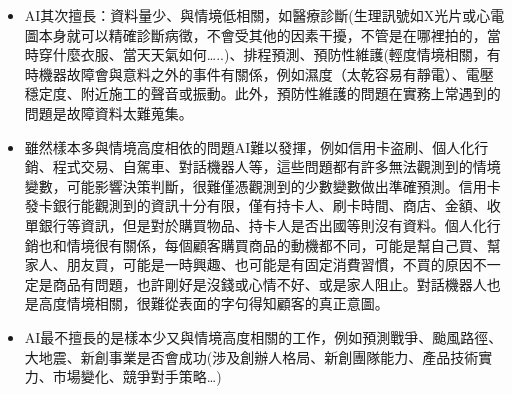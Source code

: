 \documentclass[a4paper,12pt]{article}
\begin{document}
\begin{itemize}
\item AI其次擅長：資料量少、與情境低相關，如醫療診斷(生理訊號如X光片或心電圖本身就可以精確診斷病徵，不會受其他的因素干擾，不管是在哪裡拍的，當時穿什麼衣服、當天天氣如何\ldots{}..)、排程預測、預防性維護(輕度情境相關，有時機器故障會與意料之外的事件有關係，例如濕度（太乾容易有靜電）、電壓穩定度、附近施工的聲音或振動。此外，預防性維護的問題在實務上常遇到的問題是故障資料太難蒐集。\\
\item 雖然樣本多與情境高度相依的問題AI難以發揮，例如信用卡盗刷、個人化行銷、程式交易、自駕車、對話機器人等，這些問題都有許多無法觀測到的情境變數，可能影響決策判斷，很難僅憑觀測到的少數變數做出準確預測。信用卡發卡銀行能觀測到的資訊十分有限，僅有持卡人、刷卡時間、商店、金額、收單銀行等資訊，但是對於購買物品、持卡人是否出國等則沒有資料。個人化行銷也和情境很有關係，每個顧客購買商品的動機都不同，可能是幫自己買、幫家人、朋友買，可能是一時興趣、也可能是有固定消費習慣，不買的原因不一定是商品有問題，也許剛好是沒錢或心情不好、或是家人阻止。對話機器人也是高度情境相關，很難從表面的字句得知顧客的真正意圖。\\
\item AI最不擅長的是樣本少又與情境高度相關的工作，例如預測戰爭、颱風路徑、大地震、新創事業是否會成功(涉及創辦人格局、新創團隊能力、產品技術實力、市場變化、競爭對手策略\ldots{})\\
\end{itemize}
\end{document}
